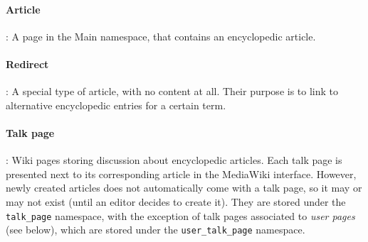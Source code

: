 \paragraph{Article}: A page in the Main namespace, that contains an encyclopedic article.
  

\paragraph{Redirect}: A special type of article, with no content at all. Their purpose
is to link to alternative encyclopedic entries for a certain term. 


\paragraph{Talk page}: Wiki pages storing discussion about encyclopedic articles. 
Each talk page is presented next to its corresponding
article in the MediaWiki interface. However, newly created articles does not automatically come
with a talk page, so it may or may not exist (until an editor decides to create it). They are
stored under the \texttt{talk\_page} namespace, with the exception of talk pages associated
to \textit{user pages} (see below), which are stored under the \texttt{user\_talk\_page} namespace.

